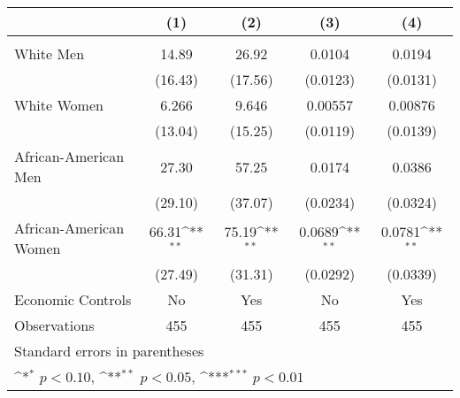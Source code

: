 {
\def\sym#1{\ifmmode^{#1}\else\(^{#1}\)\fi}
\begin{longtable}{l*{4}{c}}
\hline\hline\endfirsthead\hline\endhead\hline\endfoot\endlastfoot
                    &\multicolumn{1}{c}{(1)}&\multicolumn{1}{c}{(2)}&\multicolumn{1}{c}{(3)}&\multicolumn{1}{c}{(4)}\\
\hline
                &                     &                     &                     & \\
White Men&       14.89         &       26.92         &      0.0104         &      0.0194         \\
                    &     (16.43)         &     (17.56)         &    (0.0123)         &    (0.0131)         \\
White Women&       6.266         &       9.646         &     0.00557         &     0.00876         \\
                    &     (13.04)         &     (15.25)         &    (0.0119)         &    (0.0139)         \\
African-American Men&       27.30         &       57.25         &      0.0174         &      0.0386         \\
                    &     (29.10)         &     (37.07)         &    (0.0234)         &    (0.0324)         \\
African-American Women&       66.31\sym{**} &       75.19\sym{**} &      0.0689\sym{**} &      0.0781\sym{**} \\
                    &     (27.49)         &     (31.31)         &    (0.0292)         &    (0.0339)         \\
[1em]
Economic Controls  &          No         &         Yes         &          No         &         Yes         \\
\hline
Observations        &         455         &         455         &         455         &         455         \\
\hline\hline
\multicolumn{5}{l}{\footnotesize Standard errors in parentheses}\\
\multicolumn{5}{l}{\footnotesize \sym{*} \(p<0.10\), \sym{**} \(p<0.05\), \sym{***} \(p<0.01\)}\\
\end{longtable}
}

